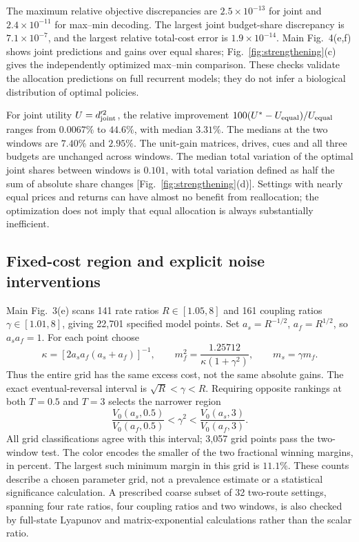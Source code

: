 The maximum relative objective discrepancies are
\(2.5\times10^{-13}\) for joint and \(2.4\times10^{-11}\) for
max--min decoding. The largest joint budget-share discrepancy is
\(7.1\times10^{-7}\), and the largest relative total-cost error
is \(1.9\times10^{-14}\). Main Fig.~4(e,f) shows joint predictions
and gains over equal shares; Fig.~\ref{fig:strengthening}(c) gives
the independently optimized max--min comparison. These checks
validate the allocation predictions on full recurrent models;
they do not infer a biological distribution of optimal policies.

For joint utility \(U=d_{\rm joint}'^2\), the relative improvement
\(100(U^*-U_{\rm equal})/U_{\rm equal}\) ranges from
\(0.0067\%\) to \(44.6\%\), with median \(3.31\%\).
The medians at the two windows are \(7.40\%\) and \(2.95\%\).
The unit-gain matrices, drives, cues and all three budgets are
unchanged across windows. The median total variation of the
optimal joint shares between windows is \(0.101\), with total
variation defined as half the sum of absolute share changes
[Fig.~\ref{fig:strengthening}(d)]. Settings with nearly equal
prices and returns can have almost no benefit from reallocation;
the optimization does not imply that equal allocation is always
substantially inefficient.

\subsection{Fixed-cost region and explicit noise interventions}

Main Fig.~3(e) scans 141 rate ratios \(R\in[1.05,8]\) and
161 coupling ratios \(\gamma\in[1.01,8]\), giving 22,701
specified model points. Set \(a_s=R^{-1/2}\), \(a_f=R^{1/2}\),
so \(a_sa_f=1\). For each point choose
\[
 \kappa=[2a_sa_f(a_s+a_f)]^{-1},\qquad
 m_f^2=\frac{1.25712}{\kappa(1+\gamma^2)},\qquad m_s=\gamma m_f.
\]
Thus the entire grid has the same excess cost, not the same
absolute gains. The exact eventual-reversal interval is
\(\sqrt R<\gamma<R\). Requiring opposite rankings at both
\(T=0.5\) and \(T=3\) selects the narrower region
\[
 \frac{V_0(a_s,0.5)}{V_0(a_f,0.5)}<\gamma^2<
 \frac{V_0(a_s,3)}{V_0(a_f,3)}.
\]
All grid classifications agree with this interval; 3,057 grid
points pass the two-window test. The color encodes the smaller
of the two fractional winning margins, in percent. The largest
such minimum margin in this grid is \(11.1\%\). These counts
describe a chosen parameter grid, not a prevalence estimate or
a statistical significance calculation. A prescribed coarse subset
of 32 two-route settings, spanning four rate ratios, four coupling
ratios and two windows, is also checked by full-state Lyapunov
and matrix-exponential calculations rather than the scalar ratio.

